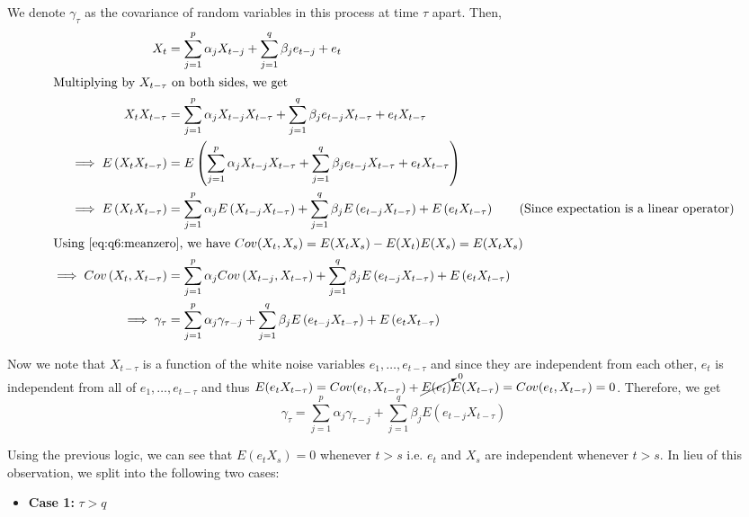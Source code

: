 \documentclass[12pt, oneside]{article}
\begin{document}
\begin{enumerate}
{    We denote \(\gamma_\tau\) as the covariance of random variables in this process
    at time \(\tau\) apart. Then,
    \begin{align*}
        X_t &= \sum_{j=1}^{p}\alpha_j X_{t-j} + \sum_{j=1}^{q} \beta_j e_{t-j} + e_t \\
        \intertext{Multiplying by \(X_{t-\tau}\) on both sides, we get}
        X_t X_{t-\tau} &= \sum_{j=1}^{p}\alpha_j X_{t-j} X_{t-\tau} + \sum_{j=1}^{q} \beta_j e_{t-j} X_{t-\tau} + e_t X_{t-\tau} \\
        \implies E\left(X_t X_{t-\tau}\right) &= E\left(\sum_{j=1}^{p}\alpha_j X_{t-j} X_{t-\tau} + \sum_{j=1}^{q} \beta_j e_{t-j} X_{t-\tau} + e_t X_{t-\tau}\right) \\
        \implies E\left(X_t X_{t-\tau}\right) &= \sum_{j=1}^{p}\alpha_j E\left(X_{t-j} X_{t-\tau}\right) + \sum_{j=1}^{q} \beta_j E\left(e_{t-j} X_{t-\tau}\right) + E\left(e_t X_{t-\tau}\right) \tag*{(Since expectation is a linear operator)} \\
        \intertext{Using \eqref{eq:q6:meanzero}, we have \(Cov(X_t, X_s) = E(X_t X_s) - E(X_t)E(X_s) = E(X_t X_s)\)}
        \implies Cov\left(X_t, X_{t-\tau}\right) &= \sum_{j=1}^{p}\alpha_j Cov\left(X_{t-j}, X_{t-\tau}\right) + \sum_{j=1}^{q} \beta_j E\left(e_{t-j} X_{t-\tau}\right) + E\left(e_t X_{t-\tau}\right) \\
        \implies \gamma_{\tau} &= \sum_{j=1}^{p}\alpha_j \gamma_{\tau - j} + \sum_{j=1}^{q} \beta_j E\left(e_{t-j} X_{t-\tau}\right) + E\left(e_t X_{t-\tau}\right)
    \end{align*}

    Now we note that \(X_{t-\tau}\) is a function of the white noise variables \(e_1,\ldots,e_{t-\tau}\) and since
    they are independent from each other, \(e_t\) is independent from all of \(e_1,\ldots,e_{t-\tau}\) and thus \(E(e_t X_{t-\tau}) = Cov(e_t, X_{t-\tau}) + \cancelto{0}{E(e_t)} E(X_{t-\tau}) = Cov(e_t, X_{t-\tau}) = 0\).
    Therefore, we get
    \begin{equation}
        \gamma_{\tau} = \sum_{j=1}^{p}\alpha_j \gamma_{\tau - j} + \sum_{j=1}^{q} \beta_j E\left(e_{t-j} X_{t-\tau}\right) \label{eq:q6:arma_var}
    \end{equation}

    Using the previous logic, we can see that \(E(e_t X_s) = 0\) whenever \(t > s\) i.e. \(e_t\) and \(X_s\) are
    independent whenever \(t > s\). In lieu of this observation, we split into the following two cases:

    \renewcommand{\labelitemi}{\textendash}
    \begin{itemize}
        \item \textbf{Case 1: } \(\tau > q\)
        

\end{itemize}}
\end{enumerate}
\end{document}

